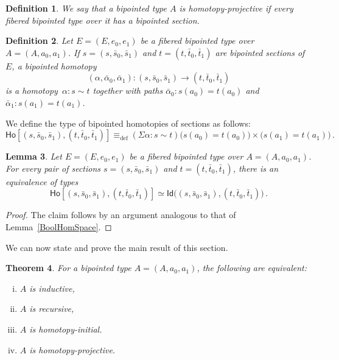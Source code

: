 \documentclass[reqno,10pt,a4paper,oneside]{amsart}
\numberwithin{equation}{section}
\theoremstyle{mythm}
\newtheorem{theorem}{Theorem}[subsection]
\newtheorem{lemma}[theorem]{Lemma}
\theoremstyle{mydef}
\newtheorem{definition}[theorem]{Definition}
\theoremstyle{myrmk}
\newcommand{\deq}{\equiv}
\newcommand{\defeq}{\deq_{\mathrm{def}}}
\newcommand{\co}{\colon}
\newcommand{\Id}{\mathsf{Id}}
\newcommand{\Ho}{\mathsf{Ho}}
\begin{document}
\begin{definition} We say that a bipointed type $A$ is \emph{homotopy-projective} if every fibered bipointed type over it has a bipointed section.
\end{definition} 

\begin{definition} \label{def:2cellsection} Let $E = (E, e_0, e_1)$ be a fibered bipointed type over $A = (A, a_0, a_1)$. If $s = (s, \bar{s}_0, 
\bar{s}_1)$ and $t = (t, \bar{t}_0, \bar{t}_1)$ are bipointed sections of $E$, a \emph{bipointed homotopy} 
\[
(\alpha, \bar{\alpha}_0, \bar{\alpha}_1) \co (s, \bar{s}_0, \bar{s}_1)  \rightarrow (t, \bar{t}_0, \bar{t}_1)
\] 
is a homotopy~$\alpha \co s \sim t$ together with paths $\bar{\alpha}_0 \co s(a_0) = t(a_0)$ and $\bar{\alpha}_1 \co s(a_1) = t(a_1)$. 
\end{definition} 


We define the type of bipointed homotopies of sections as follows:
\[
\Ho[ (s, \bar{s}_0, \bar{s}_1), (t, \bar{t}_0, \bar{t}_1)] \defeq
(\Sigma \alpha \co s \sim t) \big( s(a_0) = t(a_0) \big) \times \big( s(a_1) = t(a_1) \big) \, .
\]


\begin{lemma} Let $E = (E, e_0, e_1)$ be a fibered bipointed type over $A = (A, a_0, a_1)$. 
For every pair of sections $s = (s, \bar{s}_0, \bar{s}_1)$ and $t = (t, \bar{t}_0, \bar{t}_1)$, 
there is an equivalence of types
\[
\Ho[ (s, \bar{s}_0, \bar{s}_1), (t, \bar{t}_0, \bar{t}_1)] 
\simeq 
\Id\big( (s, \bar{s}_0, \bar{s}_1), (t, \bar{t}_0, \bar{t}_1) \big) \, .
\]
\end{lemma}


\begin{proof} The claim follows by an argument analogous to that of Lemma~\ref{BoolHomSpace}.
\end{proof}

\medskip

We can now state and prove the main result of this section. 


\begin{theorem}\label{lem:BoolMainInt} For a bipointed type $A = (A, a_0, a_1)$, the following are equivalent:
\begin{enumerate}[(i)]
\item $A$ is inductive, 
\item $A$ is recursive,
\item $A$ is homotopy-initial.
\item $A$ is homotopy-projective.
\end{enumerate}
\end{theorem}
\end{document}

